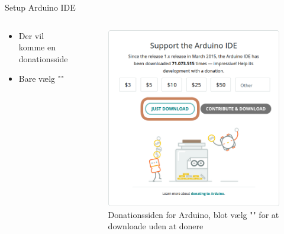 \documentclass[aspectratio=169]{beamer}
\begin{document}
\begin{frame}{Setup Arduino IDE}
\begin{columns}
	\begin{column}{0.5\textwidth}
		\begin{textBox}
			\begin{itemize}
				\item Der vil komme en donationsside
				\item Bare vælg ""
			\end{itemize}
		\end{textBox}
	\end{column}
	\begin{column}{0.5\textwidth}
		\begin{figure}
  			\includegraphics[height=0.6\textheight]{assets/pictures/just-download.png}
  			\caption{Donationssiden for Arduino, blot vælg "" for at downloade uden at donere}
  			\label{fig:just-download}
		\end{figure}
	\end{column}
\end{columns}
\end{frame}
\end{document}
